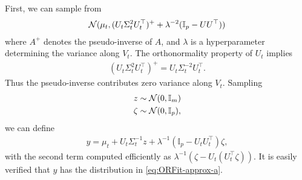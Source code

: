 First, we can sample from 
\begin{align}
    \mathcal{N}(\mu_t,(U_t \Sigma^2_t U_t^{\top})^+ + \lambda^{-2}(\mathbb{I}_p-UU^{\top})) \label{eq:ORFit-approx-a}
\end{align}
where $A^+$ denotes the pseudo-inverse of $A$, and $\lambda$ is a hyperparameter determining the variance along $V_t$. The orthonormality property of $U_t$ implies 
\begin{align}
    (U_t \Sigma_t^2 U_t^{\top})^+ = U_t \Sigma_t^{-2} U_t^{\top}.
\end{align}
Thus the pseudo-inverse contributes zero variance along $V_t$. Sampling
\begin{align}
    z &\sim \mathcal{N}(0,\mathbb{I}_m) \\
    \zeta &\sim \mathcal{N}(0,\mathbb{I}_p),
\end{align}
we can define
\begin{align}
    y = \mu_t + U_t\Sigma_t^{-1} z + \lambda^{-1} (\mathbb{I}_p - U_t U_t^{\top}) \zeta,
\end{align}
with the second term computed efficiently as $\lambda^{-1}(\zeta - U_t (U_t^{\top} \zeta))$. It is easily verified that $y$ has the distribution in \eqref{eq:ORFit-approx-a}. 

